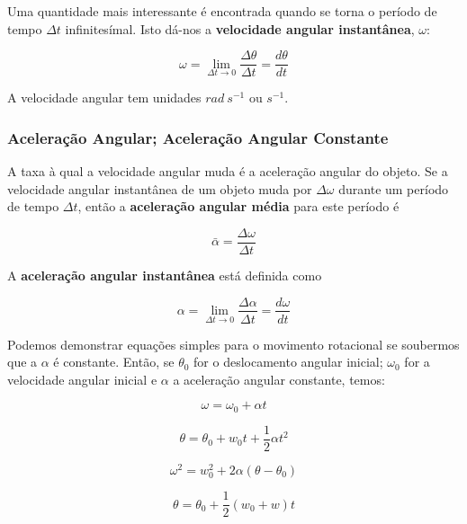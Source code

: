 Uma quantidade mais interessante é encontrada quando se torna o período de tempo $\Delta t$ infinitesímal. Isto dá-nos a \textbf{velocidade angular instantânea}, $\omega$:

\begin{equation}
    \omega = \lim_{\Delta t \to 0}\frac{\Delta \theta}{\Delta t}=\frac{d\theta}{dt}
\end{equation}

A velocidade angular tem unidades $rad\ s^{-1}$ ou $s^{-1}$.

\subsubsection{Aceleração Angular; Aceleração Angular Constante}

A taxa à qual a velocidade angular muda é a aceleração angular do objeto. Se a velocidade angular instantânea de um objeto muda por $\Delta \omega$ durante um período de tempo $\Delta t$, então a \textbf{aceleração angular média} para este período é

\begin{equation}
    \bar{\alpha}=\frac{\Delta \omega}{\Delta t}
\end{equation}

A \textbf{aceleração angular instantânea} está definida como

\begin{equation}
    \alpha = \lim_{\Delta t \to 0}\frac{\Delta \alpha}{\Delta t}=\frac{d\omega}{dt}
\end{equation}

Podemos demonstrar equações simples para o movimento rotacional se soubermos que a $\alpha$ é constante. Então, se $\theta_0$ for o deslocamento angular inicial; $\omega_0$ for a velocidade angular inicial e $\alpha$ a aceleração angular constante, temos:

\begin{equation}
    \omega = \omega_0+\alpha t
\end{equation}

\begin{equation}
    \theta = \theta_0+w_0t+\frac{1}{2}\alpha t^2
\end{equation}

\begin{equation}
    \omega^2=w_0^2+2\alpha(\theta - \theta_0)
\end{equation}

\begin{equation}
    \theta = \theta_0 + \frac{1}{2}(w_0+w)t
\end{equation}

